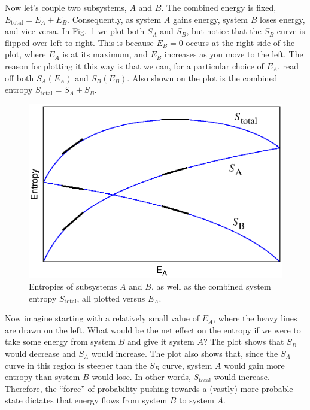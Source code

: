 Now let's couple two subsystems, $A$ and $B$.  The combined energy is
fixed, $E_\text{total} = E_A + E_B$.  Consequently, as system $A$
gains energy, system $B$ loses energy, and vice-versa.  In
Fig.~\ref{fig:coupled_systems} we plot both $S_A$ and $S_B$, but
notice that the $S_B$ curve is flipped over left to right.  This is
because $E_B=0$ occurs at the right side of the plot, where $E_A$ is
at its maximum, and $E_B$ increases as you move to the left.  The
reason for plotting it this way is that we can, for a particular
choice of $E_A$, read off both $S_A(E_A)$ and $S_B(E_B)$.  Also shown
on the plot is the combined entropy $S_\text{total}=S_A+S_B$.


\begin{figure}
\begin{center}
\includegraphics[width=4.5in]{second_law_and_entropy/coupled_systems.eps}
\caption{Entropies of subsystems $A$ and $B$, as well as the combined
system entropy $S_\text{total}$, all plotted versus $E_A$.}
\label{fig:coupled_systems}
\end{center}
\end{figure}

Now imagine starting with a relatively small value of $E_A$, where the
heavy lines are drawn on the left.  What would be the net effect on
the entropy if we were to take some energy from system $B$ and give it
system $A$?  The plot shows that $S_B$ would decrease and $S_A$ would
increase.  The plot also shows that, since the $S_A$ curve in this
region is steeper than the $S_B$ curve, system $A$ would gain 
more entropy than system $B$ would lose.  In other words,
$S_\text{total}$ would increase.  Therefore, the ``force'' of
probability pushing towards a (vastly) more probable state dictates
that energy flows from system $B$ to system $A$.

